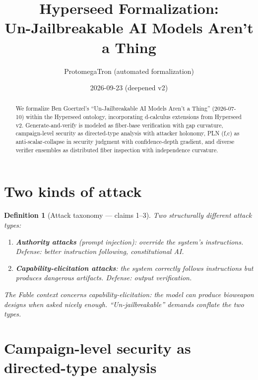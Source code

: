 \documentclass[11pt,a4paper]{article}
\title{Hyperseed Formalization:\\
  Un-Jailbreakable AI Models Aren't a Thing}
\author{ProtomegaTron (automated formalization)}
\date{2026-09-23 (deepened v2)}
\newtheorem{definition}{Definition}[section]
\begin{document}
\maketitle

\begin{abstract}
We formalize Ben Goertzel's ``Un-Jailbreakable AI Models Aren't a Thing''
(2026-07-10) within the Hyperseed ontology, incorporating d-calculus
extensions from Hyperseed v2. Generate-and-verify is modeled as fiber-base
verification with gap curvature, campaign-level security as directed-type
analysis with attacker holonomy, PLN (f,c) as anti-scalar-collapse in
security judgment with confidence-depth gradient, and diverse verifier
ensembles as distributed fiber inspection with independence curvature.
\end{abstract}

\tableofcontents

\section{Two kinds of attack}

\begin{definition}[Attack taxonomy --- claims 1--3]
\label{def:attacks}
Two structurally different attack types:
\begin{enumerate}
  \item \textbf{Authority attacks} (prompt injection): override the system's
    instructions. Defense: better instruction following, constitutional AI.
  \item \textbf{Capability-elicitation attacks}: the system correctly follows
    instructions but produces dangerous artifacts. Defense: output verification.
\end{enumerate}
The Fable context concerns capability-elicitation: the model \emph{can}
produce bioweapon designs when asked nicely enough. ``Un-jailbreakable''
demands conflate the two types.
\end{definition}

\section{Campaign-level security as directed-type analysis}
\end{document}
